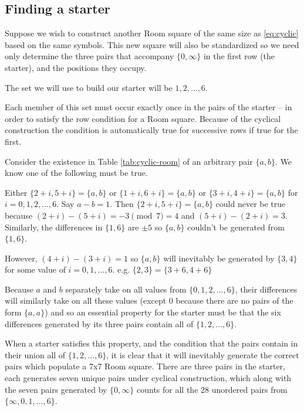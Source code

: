 \documentclass[
  11pt,
  a4paper]{book}\usepackage[]{graphicx}\usepackage[]{xcolor}
\begin{document}
\subsection{Finding a starter}

Suppose we wish to construct another Room square of the same
size as \eqref{eq:cyclic} based on the same
symbols. This new square will also be standardized so we
need only determine the three pairs that accompany
$\{0, \infty\}$ in the first row (the starter), and the
positions they occupy.

The set we will use to build our starter will be
${1, 2, \ldots, 6}$.

Each member of this set must occur exactly once in the pairs
of the starter – in order to satisfy the row condition for a
Room square.  Because of the cyclical construction the
condition is automatically true for successive rows if true
for the first.

Consider the existence in Table \ref{tab:cyclic-room} of an
arbitrary pair $\{a, b\}$. We know one of the following must be
true.

Either $\{2 + i, 5 + i\} = \{a, b\}$ or $\{1 + i, 6 + i\} = \{a, b\}$
or $\{3 + i, 4 + i\} = \{a, b\}$ for $i = 0, 1, 2, \ldots, 6$.
Say $a - b = 1$. Then $\{2 + i, 5 + i\} = \{a, b\}$ could never be
true because $(2 + i) - (5 + i) = -3\pmod 7 = 4$ and
$(5 + i) - (2 + i) = 3$. Similarly, the differences in $\{1, 6\}$
are $\pm 5$ so $\{a, b\}$ couldn’t be generated from $\{1, 6\}$.

However, $(4 + i) - (3 + i) = 1$ so $\{a, b\}$ will inevitably be
generated by $\{3, 4\}$ for some value of $i = 0, 1, \ldots, 6$.
e.g. $\{2, 3\} = \{3 + 6, 4 + 6\}$

Because $a$ and $b$ separately take on all values from
$\{0, 1, 2, \ldots, 6\}$, their differences will similarly take on
all these values (except 0 because there are no pairs of the form
$\{a, a\}$) and so an essential property for the starter must be
that the six differences generated by its three pairs contain all of
$\{1, 2, \ldots, 6\}$.

When a starter satisfies this property, and the condition
that the pairs contain in their union all of
$\{1, 2, \ldots, 6\}$, it is clear that it will inevitably generate
the correct pairs which populate a 7x7 Room square.  There
are three pairs in the starter, each generates seven unique
pairs under cyclical construction, which along with the
seven pairs generated by $\{0, \infty\}$ counts for all the
28 unordered pairs from $\{\infty, 0, 1, \ldots, 6\}$.
\end{document}
